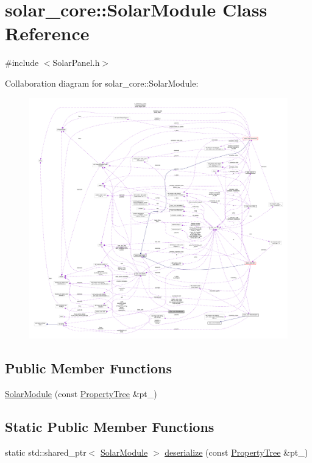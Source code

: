 \hypertarget{classsolar__core_1_1_solar_module}{}\section{solar\+\_\+core\+:\+:Solar\+Module Class Reference}
\label{classsolar__core_1_1_solar_module}


{\ttfamily \#include $<$Solar\+Panel.\+h$>$}



Collaboration diagram for solar\+\_\+core\+:\+:Solar\+Module\+:
\nopagebreak
\begin{figure}[H]
\begin{center}
\leavevmode
\includegraphics[width=350pt]{classsolar__core_1_1_solar_module__coll__graph}
\end{center}
\end{figure}
\subsection*{Public Member Functions}
\begin{DoxyCompactItemize}
\item 
\hyperlink{classsolar__core_1_1_solar_module_ae972f46a6c3bd9a1c3e7761ab1516524}{Solar\+Module} (const \hyperlink{namespacesolar__core_adeda2737d6938c190eb774a5b2495045}{Property\+Tree} \&pt\+\_\+)
\end{DoxyCompactItemize}
\subsection*{Static Public Member Functions}
\begin{DoxyCompactItemize}
\item 
static std\+::shared\+\_\+ptr$<$ \hyperlink{classsolar__core_1_1_solar_module}{Solar\+Module} $>$ \hyperlink{classsolar__core_1_1_solar_module_ad640027b60c3e9d3670938d0cea9f410}{deserialize} (const \hyperlink{namespacesolar__core_adeda2737d6938c190eb774a5b2495045}{Property\+Tree} \&pt\+\_\+)
\end{DoxyCompactItemize}
